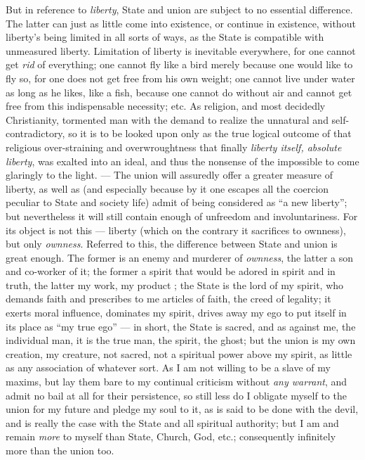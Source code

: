  But in reference to \textit{liberty}, State and union are subject to no 
essential difference. The latter can just as little come into existence, or 
continue in existence, without liberty's being limited in all sorts of ways, 
as the State is compatible with unmeasured liberty. Limitation of liberty is 
inevitable everywhere, for one cannot get \textit{rid} of everything; one 
cannot fly like a bird merely because one would like to fly so, for one does 
not get free from his own weight; one cannot live under water as long as he 
likes, like a fish, because one cannot do without air and cannot get free from 
this indispensable necessity; etc. As religion, and most decidedly 
Christianity, tormented man with the demand to realize the unnatural and self- 
contradictory, so it is to be looked upon only as the true logical outcome of 
that religious over-straining and overwroughtness that finally \textit{liberty 
itself, absolute liberty}, was exalted into an ideal, and thus the nonsense of 
the impossible to come glaringly to the light. --- The union will assuredly 
offer a greater measure of liberty, as well as (and especially because by it 
one escapes all the coercion peculiar to State and society life) admit of 
being considered as ``a new liberty''; but nevertheless it will still 
contain enough of unfreedom and involuntariness. For its object is not this --- liberty (which on the contrary it sacrifices to ownness), but only 
\textit{ownness}. Referred to this, the difference between State and union is 
great enough. The former is an enemy and murderer of \textit{ownness}, the 
latter a son and co-worker of it; the former a spirit that would be adored in 
spirit and in truth, the latter my work, my product ; the State is the lord of 
my spirit, who demands faith and prescribes to me articles of faith, the creed 
of legality; it exerts moral influence, dominates my spirit, drives away my 
ego to put itself in its place as ``my true ego'' --- in short, the State is 
sacred, and as against me, the individual man, it is the true man, the spirit, 
the ghost; but the union is my own creation, my creature, not sacred, not a 
spiritual power above my spirit, as little as any association of whatever 
sort. As I am not willing to be a slave of my maxims, but lay them bare to my 
continual criticism without \textit{any warrant}, and admit no bail at all for 
their persistence, so still less do I obligate myself to the union for my 
future and pledge my soul to it, as is said to be done with the devil, and is 
really the case with the State and all spiritual authority; but I am and 
remain \textit{more} to myself than State, Church, God, etc.; consequently 
infinitely more than the union too.

